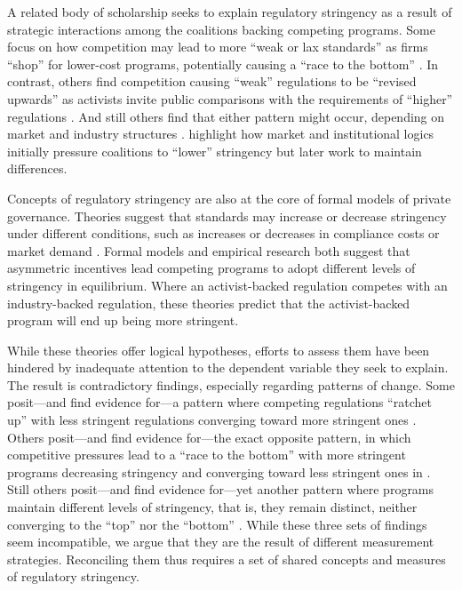 \documentclass[
      12pt,
            Review ]{article}
\begin{document}
A related body of scholarship seeks to explain regulatory stringency as a result of strategic interactions among the coalitions backing competing programs. Some focus on how competition may lead to more ``weak or lax standards'' as firms ``shop'' for lower-cost programs, potentially causing a ``race to the bottom'' \citep{Abbott2010, Fransen2011, Gulbrandsen2004}. In contrast, others find competition causing ``weak'' regulations to be ``revised upwards'' as activists invite public comparisons with the requirements of ``higher'' regulations \citep{Overdevest2005, Overdevest2010}. And still others find that either pattern might occur, depending on market and industry structures \citep{Cashore2004, Hassel2008, VanderVen2015}. \citet{Cashore2004} highlight how market and institutional logics initially pressure coalitions to ``lower'' stringency but later work to maintain differences.

Concepts of regulatory stringency are also at the core of formal models of private governance. Theories suggest that standards may increase or decrease stringency under different conditions, such as increases or decreases in compliance costs or market demand \citep{Abderrazak2009, Fischer2014}. Formal models \citep{Fischer2014, Li2015, Poret2016} and empirical research \citep{Cashore2004} both suggest that asymmetric incentives lead competing programs to adopt different levels of stringency in equilibrium. Where an activist-backed regulation competes with an industry-backed regulation, these theories predict that the activist-backed program will end up being more stringent.

While these theories offer logical hypotheses, efforts to assess them have been hindered by inadequate attention to the dependent variable they seek to explain. The result is contradictory findings, especially regarding patterns of change. Some posit---and find evidence for---a pattern where competing regulations ``ratchet up'' with less stringent regulations converging toward more stringent ones \citep{Overdevest2005, Overdevest2010, Overdevest2014}. Others posit---and find evidence for---the exact opposite pattern, in which competitive pressures lead to a ``race to the bottom'' with more stringent programs decreasing stringency and converging toward less stringent ones in \citep{Abbott2010, Fransen2011, Gulbrandsen2004}. Still others posit---and find evidence for---yet another pattern where programs maintain different levels of stringency, that is, they remain distinct, neither converging to the ``top'' nor the ``bottom'' \citep{Cashore2004}. While these three sets of findings seem incompatible, we argue that they are the result of different measurement strategies. Reconciling them thus requires a set of shared concepts and measures of regulatory stringency.
\end{document}
